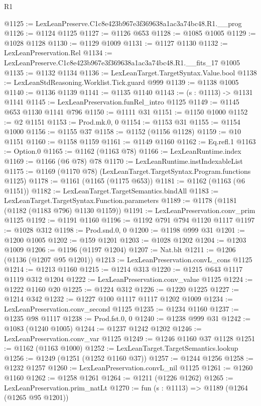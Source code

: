 \begin{lexlean}{R1}
\begin{coremodule}
@1125 := LexLeanPreserve.C1c8e423b967e3f369638a1ac3a74bc48.R1.__prog
@1126 := @1124 @1125
@1127 := @1126 @653
@1128 := @1085 @1005
@1129 := @1028 @1128
@1130 := @1129 @1009
@1131 := @1127 @1130
@1132 := LexLeanPreservation.Rel
@1134 := LexLeanPreserve.C1c8e423b967e3f369638a1ac3a74bc48.R1.__fits_17 @1005
@1135 := @1132 @1134
@1136 := LexLeanTarget.TargetSyntax.Value.bool
@1138 := LexLeanStdReasoning.Worklist.Tick.guard @999
@1139 := @1138 @1005
@1140 := @1136 @1139
@1141 := @1135 @1140
@1143 := (s : @1113) -> @1131 @1141
@1145 := LexLeanPreservation.funRel_intro @1125
@1149 := @1145 @653 @1130 @1141 @796
@1150 := @1111 @31
@1151 := @1150 @1000
@1152 := @2 @1151
@1153 := Prod.mk.{0, 0}
@1154 := @1153 @31
@1155 := @1154 @1000
@1156 := @1155 @37
@1158 := @1152 (@1156 @1128)
@1159 := @10 @1151
@1160 := @1158 @1159
@1161 := @1149 @1160
@1162 := Eq.refl.{1}
@1163 := Option.{0}
@1165 := @1162 (@1163 @78)
@1166 := LexLeanRuntime.index
@1169 := @1166 (@6 @78) @78
@1170 := LexLeanRuntime.instIndexableList
@1175 := @1169 (@1170 @78) (LexLeanTarget.TargetSyntax.Program.functions @1125)
@1178 := @1161 (@1165 (@1175 @653))
@1181 := @1162 (@1163 (@6 @1151))
@1182 := LexLeanTarget.TargetSemantics.bindAll
@1183 := LexLeanTarget.TargetSyntax.Function.parameters
@1189 := @1178 (@1181 (@1182 (@1183 @796) @1130 @1159))
@1191 := LexLeanPreservation.conv_prim @1125
@1192 := @1191 @1160
@1196 := @1192 @791 @794 @1120 @1117
@1197 := @1028 @312
@1198 := Prod.snd.{0, 0}
@1200 := @1198 @999 @31
@1201 := @1200 @1005
@1202 := @159 @1201
@1203 := @1028 @1202
@1204 := @1203 @1009
@1206 := @1196 (@1197 @1204)
@1207 := Nat.blt
@1211 := @1206 (@1136 (@1207 @95 @1201))
@1213 := LexLeanPreservation.convL_cons @1125
@1214 := @1213 @1160
@1215 := @1214 @313
@1220 := @1215 @643 @1117 @1119 @312 @1204
@1222 := LexLeanPreservation.conv_value @1125
@1224 := @1222 @1160 @20
@1225 := @1224 @312
@1226 := @1220 @1225
@1227 := @1214 @342
@1232 := @1227 @100 @1117 @1117 @1202 @1009
@1234 := LexLeanPreservation.conv_second @1125
@1235 := @1234 @1160
@1237 := @1235 @98 @1117
@1238 := Prod.fst.{0, 0}
@1240 := @1238 @999 @31
@1242 := @1083 (@1240 @1005)
@1244 := @1237 @1242 @1202
@1246 := LexLeanPreservation.conv_var @1125
@1249 := @1246 @1160 @37 @1128
@1251 := @1162 (@1163 @1000)
@1252 := LexLeanTarget.TargetSemantics.lookup
@1256 := @1249 (@1251 (@1252 @1160 @37))
@1257 := @1244 @1256
@1258 := @1232 @1257
@1260 := LexLeanPreservation.convL_nil @1125
@1261 := @1260 @1160
@1262 := @1258 @1261
@1264 := @1211 (@1226 @1262)
@1265 := LexLeanPreservation.prim_natLt
@1270 := fun (s : @1113) => @1189 (@1264 (@1265 @95 @1201))

\end{coremodule}
\end{lexlean}
